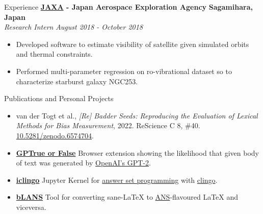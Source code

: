 \documentclass{resume} %
\begin{document}
\begin{rSection}{Experience}
	{\bf \href{https://global.jaxa.jp/}{JAXA} -  Japan Aerospace Exploration Agency} \hfill \textbf{Sagamihara, Japan}
	\\ \textit{Research Intern} \hfill {\em August 2018 - October 2018}
	\begin{itemize}\vspace{-0.5em}
		\item Developed software to estimate visibility of satellite given simulated orbits and thermal
		      constraints.
		\item Performed multi-parameter regression on ro-vibrational dataset so to characterize
		      starburst galaxy NGC253.
	\end{itemize}
\end{rSection}

\begin{rSection}{Publications and Personal Projects}

	\begin{itemize}
		\item van der Togt et al., \textit{[Re] Badder Seeds: Reproducing the Evaluation of Lexical
			      Methods for Bias Measurement}, 2022. ReScience C 8,
		      \#40. \href{https://doi.org/10.5281/zenodo.6574704}{10.5281/zenodo.6574704}.
		\item
		      {\bf \href{https://www.giuliostarace.com/projects/gptrue-or-false/}{GPTrue or False}}
		      Browser extension showing the likelihood that given body of text was generated by
		      \href{https://openai.com/blog/better-language-models/}{OpenAI's GPT-2}.
		\item
		      {\bf \href{https://github.com/thesofakillers/iclingo}{iclingo}}
		      Jupyter Kernel for \href{https://en.wikipedia.org/wiki/Answer_set_programming}{answer set
			      programming}  with \href{https://potassco.org/clingo/}{clingo}.
		\item
		      {\bf \href{https://github.com/thesofakillers/bLANS}{bLANS}} Tool for converting sane-LaTeX
		      to \href{https://ans.app/}{ANS}-flavoured LaTeX and viceversa.
	\end{itemize}
\end{rSection}
\end{document}
